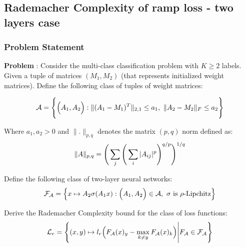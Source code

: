 \newpage
\subsection{Rademacher Complexity of ramp loss - two layers case}
\subsubsection{Problem Statement}
\textbf{Problem} : Consider the multi-class classification problem with $K \ge 2$ labels. Given a tuple of matrices $(M_1, M_2)$ (that represents initialized weight matrices). Define the following class of tuples of weight matrices:

\begin{align*}
    \mathcal{A} = \Bigg\{ 
        \Big( 
            A_1, A_2
         \Big) : \| (A_1 - M_1)^T \|_{2, 1} \le a_1, \ \| A_2 - M_2 \|_F \le a_2
     \Bigg\}
\end{align*}

\noindent Where $a_1, a_2 > 0$ and $\|.\|_{p, q}$ denotes the matrix $(p, q)$ norm defined as:
\begin{align*}
    \|A\|_{p, q} = \Bigg( \sum_j\Bigg( \sum_{i}|A_{ij}|^p \Bigg)^{q/p} \Bigg)^{1/q}
\end{align*}    

\noindent Define the following class of two-layer neural networks:
\begin{align*}
    \F_\mathcal{A} = \bigCurl{
        x\mapsto A_2\sigma(A_1x) : \bigRound{A_1, A_2}\in\mathcal{A}, \ \sigma \text{ is } \rho\text{-Lipchitz}
    }
\end{align*}

\noindent Derive the Rademacher Complexity bound for the class of loss functions:
\begin{align*}
    \mathcal{L}_r = \Bigg\{ 
        (x, y) \mapsto l_r\Big( 
            F_\mathcal{A}(x)_y - \max_{k\ne y}F_\mathcal{A}(x)_k
         \Big) \Bigg| F_\mathcal{A} \in \mathcal{F}_\mathcal{A}
     \Bigg\}
\end{align*}

